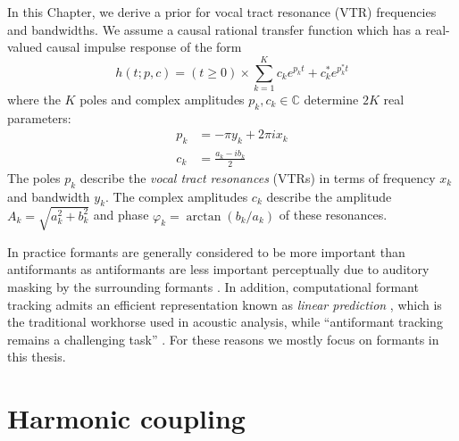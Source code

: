 \begin{chaptersections}{%
In this Chapter, we derive a prior for vocal tract resonance (VTR) frequencies and bandwidths.
}
We assume a causal rational transfer function which has a real-valued causal impulse response of the form
\begin{equation}
    h(t; p, c) = (t \geq 0) \times \sum_{k=1}^K c_k e^{p_k t} + c_k^* e^{p_k^* t}
\end{equation}
where the $K$ poles and complex amplitudes $p_k, c_k \in \mathbb{C}$ determine $2K$ real parameters:
\begin{align}
    p_k &= -\pi y_k + 2\pi i x_k \\
    c_k& = \frac{a_k - ib_k}{2}
\end{align}
The poles $p_k$ describe the \emph{vocal tract resonances} (VTRs) in terms of frequency $x_k$ and bandwidth $y_k$.
The complex amplitudes $c_k$ describe the amplitude $A_k = \sqrt{a_k^2 + b_k^2}$ and phase $\varphi_k = \arctan(b_k/a_k)$ of these resonances.

In practice formants are generally considered to be more important than antiformants as antiformants are less important perceptually due to auditory masking by the surrounding formants \citep{Schroeder1999}.
In addition, computational formant tracking admits an efficient representation known as \emph{linear prediction} \citep[LP;][]{Markel1976}, which is the traditional workhorse used in acoustic analysis, while ``antiformant tracking remains a challenging task'' \citep[][p.~11]{Mehta2012}.
For these reasons we mostly focus on formants in this thesis.

\section{Harmonic coupling}



\end{chaptersections}
